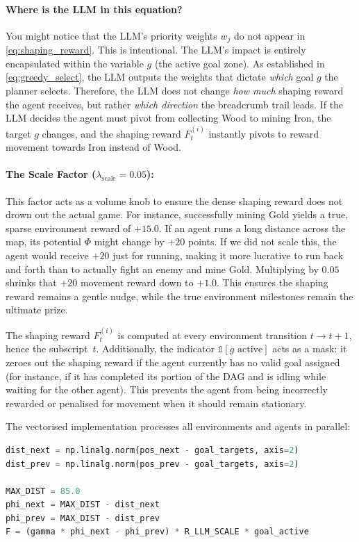 \paragraph{Where is the LLM in this equation?}
You might notice that the LLM's priority weights $w_j$ do not appear in \cref{eq:shaping_reward}. This is intentional. The LLM's impact is entirely encapsulated within the variable $g$ (the active goal zone). As established in \cref{eq:greedy_select}, the LLM outputs the weights that dictate \emph{which} goal $g$ the planner selects. Therefore, the LLM does not change \emph{how much} shaping reward the agent receives, but rather \emph{which direction} the breadcrumb trail leads. If the LLM decides the agent must pivot from collecting Wood to mining Iron, the target $g$ changes, and the shaping reward $F_t^{(i)}$ instantly pivots to reward movement towards Iron instead of Wood.

\paragraph{The Scale Factor ($\lambda_{\text{scale}} = 0.05$):}
This factor acts as a volume knob to ensure the dense shaping reward does not drown out the actual game. For instance, successfully mining Gold yields a true, sparse environment reward of $+15.0$. If an agent runs a long distance across the map, its potential $\Phi$ might change by $+20$ points. If we did not scale this, the agent would receive $+20$ just for running, making it more lucrative to run back and forth than to actually fight an enemy and mine Gold. Multiplying by $0.05$ shrinks that $+20$ movement reward down to $+1.0$. This ensures the shaping reward remains a gentle nudge, while the true environment milestones remain the ultimate prize.

\medskip

The shaping reward $F_t^{(i)}$ is computed at every environment transition
$t \to t{+}1$, hence the subscript~$t$.
Additionally, the indicator $\mathds{1}[g \text{ active}]$ acts as a mask:
it zeroes out the shaping reward if the agent currently has no valid goal
assigned (for instance, if it has completed its portion of the DAG and
is idling while waiting for the other agent). This prevents the agent from
being incorrectly rewarded or penalised for movement when it should
remain stationary.

The vectorised implementation processes all environments and agents in parallel:

\begin{lstlisting}[style=code, language=Python, caption={Vectorised PBRS in \texttt{orchestrator.py}.}, label={lst:pbrs_code}]
dist_next = np.linalg.norm(pos_next - goal_targets, axis=2)
dist_prev = np.linalg.norm(pos_prev - goal_targets, axis=2)

MAX_DIST = 85.0
phi_next = MAX_DIST - dist_next
phi_prev = MAX_DIST - dist_prev
F = (gamma * phi_next - phi_prev) * R_LLM_SCALE * goal_active
\end{lstlisting}

